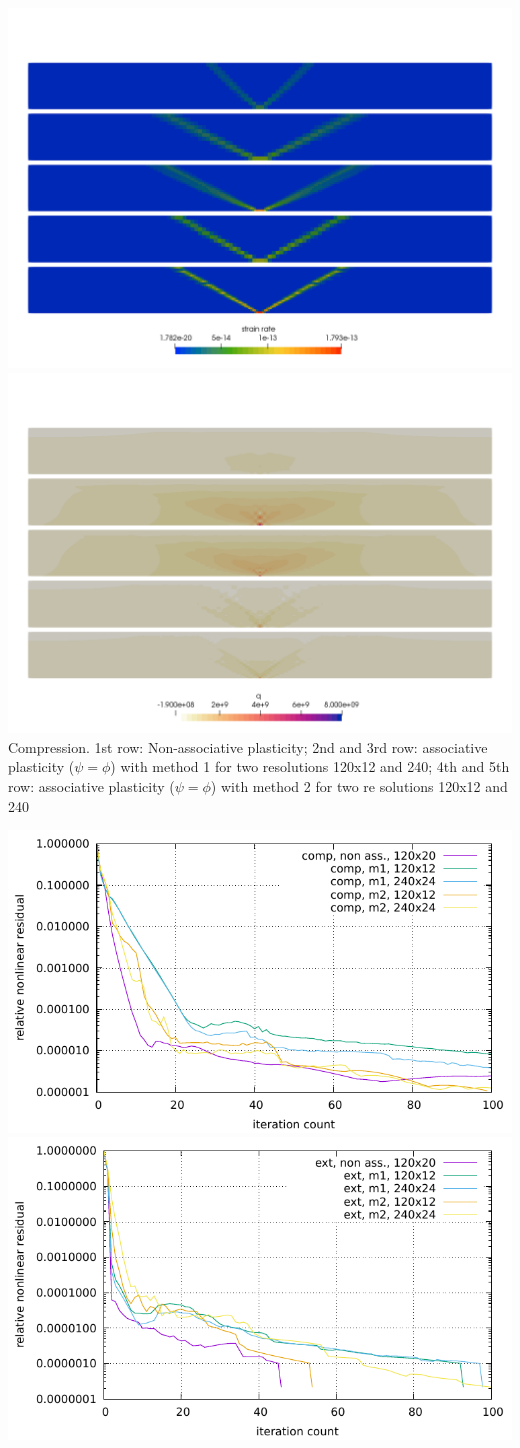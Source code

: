 \begin{center}
\includegraphics[width=.8\linewidth]{python_codes/fieldstone_39/images/compression_sr}\\
\includegraphics[width=.8\linewidth]{python_codes/fieldstone_39/images/compression_press}\\
{\small Compression. 1st row: Non-associative plasticity; 2nd and 3rd row: associative plasticity ($\psi=\phi$) with method 1 for two resolutions 120x12 and 240; 4th and 5th row: associative plasticity ($\psi=\phi$) with method 2 for two re    solutions 120x12 and 240}
\end{center}


\begin{center}
\includegraphics[width=.5\linewidth]{python_codes/fieldstone_39/images/conv_compression}
\includegraphics[width=.5\linewidth]{python_codes/fieldstone_39/images/conv_extension}
\end{center}

